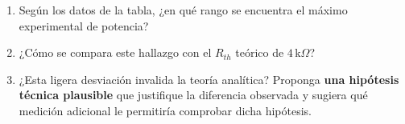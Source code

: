\documentclass[11pt, a4paper]{article}
\begin{document}
\begin{enumerate}
    \item Según los datos de la tabla, ¿en qué rango se encuentra el máximo experimental de potencia?
    \item ¿Cómo se compara este hallazgo con el $R_{th}$ teórico de $4\,\text{k}\Omega$?
    \item ¿Esta ligera desviación invalida la teoría analítica? Proponga \textbf{una hipótesis técnica plausible} que justifique la diferencia observada y sugiera qué medición adicional le permitiría comprobar dicha hipótesis.
\end{enumerate}
\end{document}
